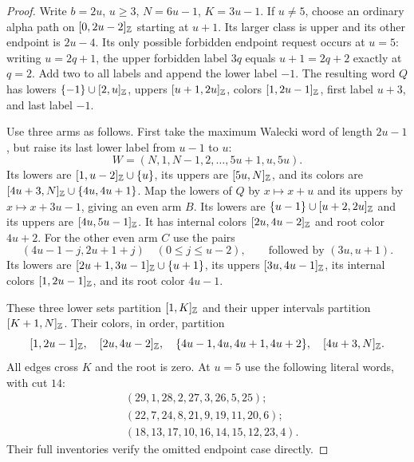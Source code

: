 \begin{proof}
Write $b=2u$, $u\ge3$, $N=6u-1$, $K=3u-1$.
If $u\ne5$, choose an ordinary alpha path on
$[0,2u-2]_{\mathbb Z}$ starting at $u+1$.  Its larger class is
upper and its other endpoint is $2u-4$.  Its only possible
forbidden endpoint request occurs at $u=5$: writing $u=2q+1$,
the upper forbidden label $3q$ equals $u+1=2q+2$ exactly at
$q=2$.  Add two to all labels and append the lower label $-1$.
The resulting word $Q$ has lowers
$\{-1\}\cup[2,u]_{\mathbb Z}$, uppers
$[u+1,2u]_{\mathbb Z}$, colors $[1,2u-1]_{\mathbb Z}$, first
label $u+3$, and last label $-1$.

Use three arms as follows.  First take the maximum Walecki word of
length $2u-1$, but raise its last lower label from $u-1$ to $u$:
\[
 W=(N,1,N-1,2,\ldots,5u+1,u,5u).
\]
Its lowers are $[1,u-2]_{\mathbb Z}\cup\{u\}$, its uppers
are $[5u,N]_{\mathbb Z}$, and its colors are
$[4u+3,N]_{\mathbb Z}\cup\{4u,4u+1\}$.
Map the lowers of $Q$ by $x\mapsto x+u$ and its uppers by
$x\mapsto x+3u-1$, giving an even arm $B$.
Its lowers are $\{u-1\}\cup[u+2,2u]_{\mathbb Z}$ and its
uppers are $[4u,5u-1]_{\mathbb Z}$.  It has internal colors
$[2u,4u-2]_{\mathbb Z}$ and root color $4u+2$.
For the other even arm $C$ use the pairs
\[
 (4u-1-j,2u+1+j)\quad(0\le j\le u-2),
 \qquad\text{followed by }(3u,u+1).
\]
Its lowers are $[2u+1,3u-1]_{\mathbb Z}\cup\{u+1\}$,
its uppers $[3u,4u-1]_{\mathbb Z}$, its internal colors
$[1,2u-1]_{\mathbb Z}$, and its root color $4u-1$.

These three lower sets partition $[1,K]_{\mathbb Z}$ and their
upper intervals partition $[K+1,N]_{\mathbb Z}$.  Their colors,
in order, partition
\[
 [1,2u-1]_{\mathbb Z},\quad[2u,4u-2]_{\mathbb Z},\quad
 \{4u-1,4u,4u+1,4u+2\},\quad[4u+3,N]_{\mathbb Z}.
\]
All edges cross $K$ and the root is zero.
At $u=5$ use the following literal words, with cut $14$:
\[
\begin{split}
 &(29,1,28,2,27,3,26,5,25);\\
 &(22,7,24,8,21,9,19,11,20,6);\\
 &(18,13,17,10,16,14,15,12,23,4).
\end{split}
\]
Their full inventories verify the omitted endpoint case directly.
\end{proof}

